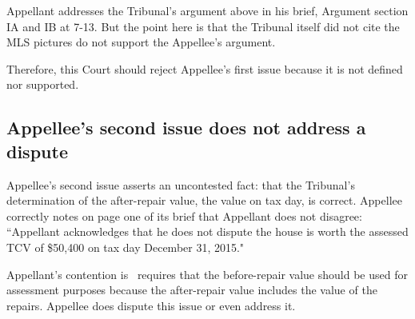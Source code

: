 \documentclass[12pt,\documentclassflag]{michiganCourtOfAppealsBrief}
\begin{document}
Appellant addresses the Tribunal's argument above in his brief, Argument section IA and IB at 7-13. But the point here is that the Tribunal itself did not cite the MLS pictures do not support the Appellee's argument.

Therefore, this Court should reject Appellee's first issue because it is not defined nor supported. 




\subsection{Appellee's second issue does not address a dispute}

Appellee's second issue asserts an uncontested fact: that the Tribunal's determination of the after-repair value, the value on tax day, is correct. Appellee correctly notes on page one of its brief that Appellant does not disagree: ``Appellant acknowledges that he does not dispute the house is worth the assessed TCV of \$50,400 on tax day December 31, 2015."

Appellant's contention is \mathieuGast\ requires that the before-repair value should be used for assessment purposes because the after-repair value includes the value of the repairs. Appellee does dispute this issue or even address it.



\end{document}

